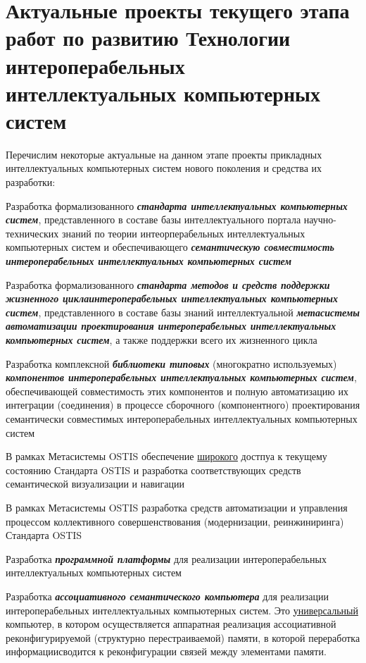 \section*{Актуальные проекты текущего этапа работ по развитию Технологии интероперабельных интеллектуальных компьютерных систем}

Перечислим некоторые актуальные на данном этапе проекты прикладных интеллектуальных компьютерных систем нового поколения и средства их разработки:
\begin{textitemize}
	\item 
	Разработка формализованного \textbf{\textit{стандарта интеллектуальных компьютерных систем}}, представленного в составе базы интеллектуального портала научно-технических знаний по теории интеорперабельных интеллектуальных компьютерных систем и обеспечивающего \textbf{\textit{семантическую совместимость интероперабельных интеллектуальных компьютерных систем}}
	\item 
	Разработка формализованного \textbf{\textit{стандарта методов и средств поддержки жизненного циклаинтероперабельных интеллектуальных компьютерных систем}}, представленного в составе базы знаний интеллектуальной \textbf{\textit{метасистемы автоматизации проектирования интероперабельных интеллектуальных компьютерных систем}}, а также поддержки всего их жизненного цикла
	\item 
	Разработка комплексной \textbf{\textit{библиотеки типовых}} (многократно используемых) \textbf{\textit{компонентов интероперабельных интеллектуальных компьютерных систем}}, обеспечивающей совместимость этих компонентов и полную автоматизацию их интеграции (соединения) в процессе сборочного (компонентного) проектирования семантически совместимых интероперабельных интеллектуальных компьютерных систем
	\item 
	В рамках Метасистемы OSTIS обеспечение \uline{широкого} достпуа к текущему состоянию Стандарта OSTIS и разработка соответствующих средств семантической визуализации и навигации
	\item 
	В рамках Метасистемы OSTIS разработка средств автоматизации и управления процессом коллективного совершенствования (модернизации, реинжиниринга) Стандарта OSTIS
	\item
	Разработка \textbf{\textit{программной платформы}} для реализации интероперабельных интеллектуальных компьютерных систем
	\item 
	Разработка \textbf{\textit{ассоциативного семантического компьютера}} для реализации интероперабельных интеллектуальных компьютерных систем. Это \uline{универсальный} компьютер, в котором осуществляется аппаратная реализация ассоциативной реконфигурируемой (структурно перестраиваемой) памяти, в которой переработка информациисводится к реконфигурации связей между элементами памяти.

\end{textitemize}
